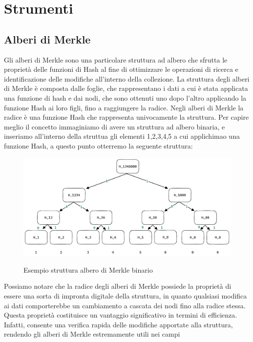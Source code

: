 \section{Strumenti}
\subsection{Alberi di Merkle}

Gli alberi di Merkle sono una particolare struttura ad albero che sfrutta le proprietà delle funzioni di Hash al fine di
ottimizzare le operazioni di ricerca e identificazione delle modifiche all'interno della collezione. La struttura degli
alberi di Merkle è composta dalle foglie, che rappresentano i dati a cui è stata applicata una funzione di
hash e dai nodi, che sono ottenuti uno dopo l'altro applicando la funzione Hash ai loro figli, fino a raggiungere
la radice. Negli alberi di Merkle la radice è una funzione Hash che rappresenta univocamente la struttura. Per capire
meglio il concetto immaginiamo di avere un struttura ad albero binaria, e inseriamo all'interno della struttua gli
elementi 1,2,3,4,5 a cui applichimao una funzione Hash, a questo punto otterremo la seguente struttura:
\begin{figure}[H]
    \centering
    \includegraphics[width=13cm]{./chapters/2.rln-protocol/images/1.merkle_tree.png}
    \label{fig:merkle_tree}
    \captionsetup{justification=centering}
    \caption{Esempio struttura albero di Merkle binario}
\end{figure}
Possiamo notare che la radice degli alberi di Merkle possiede la proprietà di essere una sorta di impronta digitale
della struttura, in quanto qualsiasi modifica ai dati comporterebbe un cambiamento a cascata dei nodi fino alla radice
stessa. Questa proprietà costituisce un vantaggio significativo in termini di efficienza. Infatti, consente una verifica
rapida delle modifiche apportate alla struttura, rendendo gli alberi di Merkle estremamente utili nei campi
